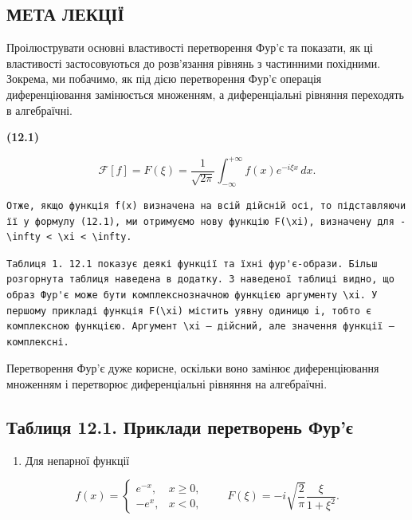 \documentclass[
  ukrainian,
]{article}
\providecommand{\tightlist}{%
  \setlength{\itemsep}{0pt}\setlength{\parskip}{0pt}}
\begin{document}
\subsection{МЕТА
ЛЕКЦІЇ}\label{ux43cux435ux442ux430-ux43bux435ux43aux446ux456ux457}

Проілюструвати основні властивості перетворення Фур'є та показати, як ці
властивості застосовуються до розв'язання рівнянь з частинними
похідними. Зокрема, ми побачимо, як під дією перетворення Фур'є операція
диференціювання замінюється множенням, а диференціальні рівняння
переходять в алгебраїчні.

\textbf{(12.1)}

\[
\mathcal{F}[f] = F(\xi) = \frac{1}{\sqrt{2\pi}} \int_{-\infty}^{+\infty} f(x)e^{-i\xi x}\,dx.
\]

\begin{verbatim}
Отже, якщо функція f(x) визначена на всій дійсній осі, то підставляючи її у формулу (12.1), ми отримуємо нову функцію F(\xi), визначену для -\infty < \xi < \infty.
\end{verbatim}

\begin{verbatim}
Таблиця 1. 12.1 показує деякі функції та їхні фур'є-образи. Більш розгорнута таблиця наведена в додатку. З наведеної таблиці видно, що образ Фур'є може бути комплекснозначною функцією аргументу \xi. У першому прикладі функція F(\xi) містить уявну одиницю i, тобто є комплексною функцією. Аргумент \xi — дійсний, але значення функції — комплексні.
\end{verbatim}

Перетворення Фур'є дуже корисне, оскільки воно замінює диференціювання
множенням і перетворює диференціальні рівняння на алгебраїчні.

\subsection{Таблиця 12.1. Приклади перетворень
Фур'є}\label{ux442ux430ux431ux43bux438ux446ux44f-12.1.-ux43fux440ux438ux43aux43bux430ux434ux438-ux43fux435ux440ux435ux442ux432ux43eux440ux435ux43dux44c-ux444ux443ux440ux454}

\begin{enumerate}
\def\labelenumi{\arabic{enumi}.}
\tightlist
\item
  Для непарної функції
\end{enumerate}

\[
f(x)=
\begin{cases}
e^{-x}, & x\ge 0,\\
-e^{x}, & x<0,
\end{cases}
\qquad
F(\xi)=-i\sqrt{\frac{2}{\pi}}\frac{\xi}{1+\xi^2}.
\]
\end{document}
